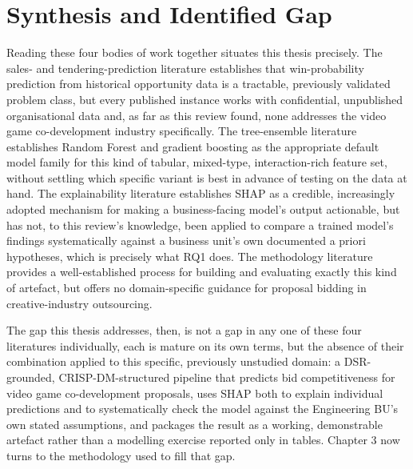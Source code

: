 \documentclass[12pt,oneside]{report}
\begin{document}
\hypertarget{synthesis-and-identified-gap}{%
\section{Synthesis and Identified
Gap}\label{synthesis-and-identified-gap}}

Reading these four bodies of work together situates this thesis
precisely. The sales- and tendering-prediction literature
\citep{yan2015sales, zahid2021predicting, rezazadeh2020generalized}
establishes that win-probability prediction from historical opportunity
data is a tractable, previously validated problem class, but every
published instance works with confidential, unpublished organisational
data and, as far as this review found, none addresses the video game
co-development industry specifically. The tree-ensemble literature
\citep{breiman2001random, friedman2001greedy, chen2016xgboost}
establishes Random Forest and gradient boosting as the appropriate
default model family for this kind of tabular, mixed-type,
interaction-rich feature set, without settling which specific variant is
best in advance of testing on the data at hand. The explainability
literature \citep{lundberg2017unified, olan2024enabling} establishes
SHAP as a credible, increasingly adopted mechanism for making a
business-facing model's output actionable, but has not, to this review's
knowledge, been applied to compare a trained model's findings
systematically against a business unit's own documented a priori
hypotheses, which is precisely what RQ1 does. The methodology literature
\citep{hevner2004design, peffers2007design, chapman2000crispdm, schroer2021systematic}
provides a well-established process for building and evaluating exactly
this kind of artefact, but offers no domain-specific guidance for
proposal bidding in creative-industry outsourcing.

The gap this thesis addresses, then, is not a gap in any one of these
four literatures individually, each is mature on its own terms, but the
absence of their combination applied to this specific, previously
unstudied domain: a DSR-grounded, CRISP-DM-structured pipeline that
predicts bid competitiveness for video game co-development proposals,
uses SHAP both to explain individual predictions and to systematically
check the model against the Engineering BU's own stated assumptions, and
packages the result as a working, demonstrable artefact rather than a
modelling exercise reported only in tables. Chapter 3 now turns to the
methodology used to fill that gap.
\end{document}
